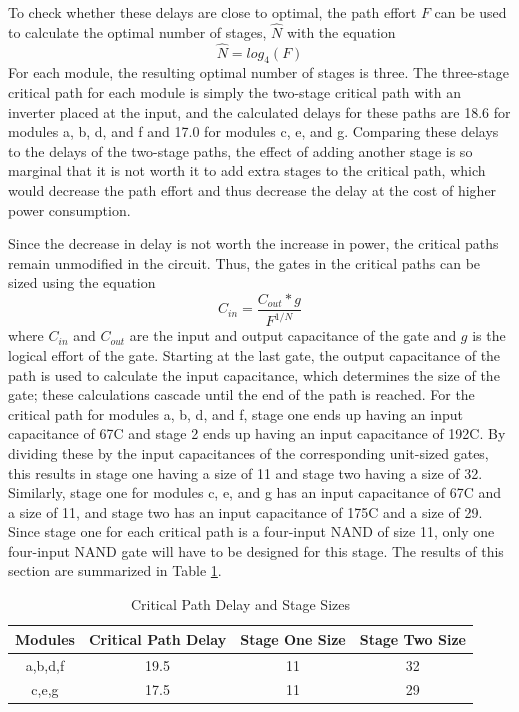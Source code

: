 \documentclass[12pt]{article}
\begin{document}
To check whether these delays are close to optimal, the path effort \(F\) can be used to calculate the optimal number of stages, \(\hat{N}\) with the equation
\begin{equation}
	\hat{N} = log_4(F)
\end{equation}
For each module, the resulting optimal number of stages is three.
The three-stage critical path for each module is simply the two-stage critical path with an inverter placed at the input, and the calculated delays for these paths are 18.6 for modules a, b, d, and f and 17.0 for modules c, e, and g. 
Comparing these delays to the delays of the two-stage paths, the effect of adding another stage is so marginal that it is not worth it to add extra stages to the critical path, which would decrease the path effort and thus decrease the delay at the cost of higher power consumption.

Since the decrease in delay is not worth the increase in power, the critical paths remain unmodified in the circuit.
Thus, the gates in the critical paths can be sized using the equation
\begin{equation}
	C_{in} = \frac{C_{out}*g}{F^{1/N}}
\end{equation}
where \(C_{in}\) and \(C_{out}\) are the input and output capacitance of the gate and \(g\) is the logical effort of the gate.
Starting at the last gate, the output capacitance of the path is used to calculate the input capacitance, which determines the size of the gate; these calculations cascade until the end of the path is reached.
For the critical path for modules a, b, d, and f, stage one ends up having an input capacitance of 67C and stage 2 ends up having an input capacitance of 192C. 
By dividing these by the input capacitances of the corresponding unit-sized gates, this results in stage one having a size of 11 and stage two having a size of 32.
Similarly, stage one for modules c, e, and g has an input capacitance of 67C and a size of 11, and stage two has an input capacitance of 175C and a size of 29.
Since stage one for each critical path is a four-input NAND of size 11, only one four-input NAND gate will have to be designed for this stage.
The results of this section are summarized in Table \ref{tab:delay_sizing}.

\begin{table}[H]
	\centering
	\caption{Critical Path Delay and Stage Sizes}
	\label{tab:delay_sizing}
	\begin{tabular}{cccc}
		\toprule
		Modules & Critical Path Delay & Stage One Size & Stage Two Size	\\
		\midrule
		a,b,d,f & 19.5 & 11 & 32\\
		c,e,g & 17.5 & 11 & 29\\
		\bottomrule
	\end{tabular}
\end{table}
\end{document}
